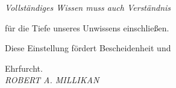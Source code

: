\thispagestyle{empty}

\noindent

\vspace*{4cm}

\hspace{5cm}\it Vollst\"{a}ndiges Wissen muss auch Verst\"{a}ndnis\

\hspace{5cm}f\"{u}r die Tiefe unseres Unwissens einschlie{\ss}en.\

\hspace{5cm}Diese Einstellung f\"{o}rdert Bescheidenheit und\

\hspace{5cm}Ehrfurcht.\\

\hspace{8.3cm} \sl ROBERT A. MILLIKAN



\cleardoublepage
